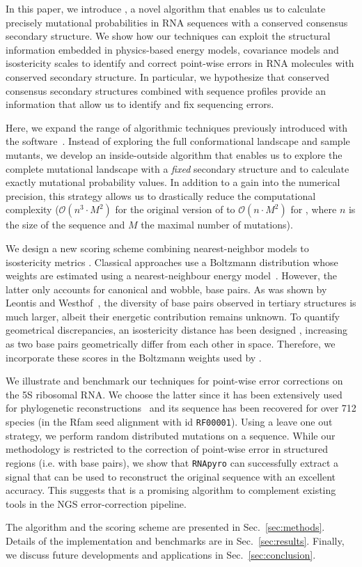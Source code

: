 In this paper, we introduce \RNApyro, a novel algorithm that enables us to calculate precisely mutational probabilities in RNA sequences with a
conserved consensus secondary structure. We show how our techniques can exploit the structural information embedded in physics-based energy models, 
covariance models and isostericity scales to identify and correct point-wise errors in RNA molecules with conserved secondary structure. In particular, we 
hypothesize that  conserved consensus secondary structures combined with sequence profiles  provide an information that allow us to identify and fix sequencing errors.

Here, we expand the range of algorithmic techniques previously introduced with the \RNAmutants software~\cite{Waldispuhl2008,Waldispuhl2011}.
Instead of exploring the full conformational landscape and sample mutants, we develop an inside-outside algorithm that enables us
to explore the complete mutational landscape with a \emph{fixed} secondary structure and to calculate exactly mutational probability values. In addition
to a gain into the numerical precision, this strategy allows us to drastically reduce the computational complexity ($\mathcal{O}(n^3 \cdot M^2)$ for the
original version of  \RNAmutants to $\mathcal{O}(n \cdot M^2)$ for \RNApyro, where $n$ is the size of the sequence and $M$ the maximal number of mutations).

We design a new scoring scheme combining nearest-neighbor models \cite{Turner2010} to isostericity metrics \cite{Stombaugh2009}.
Classical approaches use a Boltzmann distribution whose weights are estimated using a nearest-neighbour energy model~\cite{Turner2010}. However, the
latter only accounts for  canonical and wobble, base pairs. As was shown by Leontis and Westhof~\cite{Leontis2001},
the diversity of base pairs observed in tertiary structures is much larger, albeit their energetic contribution remains unknown. To quantify geometrical discrepancies, 
an isostericity distance has been designed \cite{Stombaugh2009}, increasing as two base pairs geometrically differ from each other in space. Therefore, we 
incorporate these scores in the Boltzmann weights used by \RNApyro.
 
We illustrate and benchmark our techniques for point-wise error corrections on the 5S ribosomal RNA. We choose the latter since it has been extensively
used for phylogenetic reconstructions~\cite{Hori1987} and its sequence has been recovered for over 712 species (in the Rfam seed alignment with id
\texttt{RF00001}). Using a leave one out strategy, we perform random distributed mutations on a sequence. While our methodology is restricted to the correction of 
point-wise error in structured regions (i.e. with base pairs), we show that \texttt{RNApyro} can successfully extract a signal that can be used to reconstruct the 
original sequence with an excellent accuracy. This suggests that \RNApyro is a promising algorithm to complement existing tools in the NGS error-correction 
pipeline.

The algorithm and the scoring scheme are presented in Sec.~\ref{sec:methods}. Details of the implementation and benchmarks are in Sec.~\ref{sec:results}. 
Finally, we discuss future developments and applications in Sec.~\ref{sec:conclusion}.